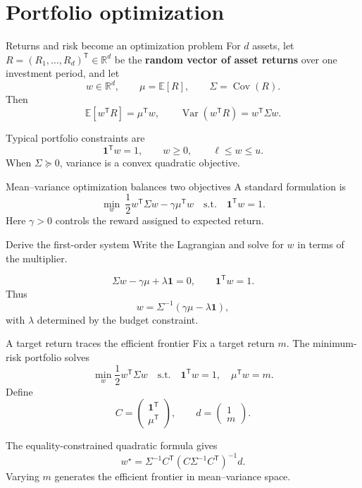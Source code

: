 \documentclass[aspectratio=169,11pt]{beamer}
\newcommand{\R}{\mathbb{R}}
\newcommand{\E}{\mathbb{E}}
\newcommand{\trans}{^{\mathsf T}}
\begin{document}
\section{Portfolio optimization}

\begin{frame}{Returns and risk become an optimization problem}
  For $d$ assets, let $R=(R_1,\ldots,R_d)\trans\in\R^d$ be the
  \textbf{random vector of asset returns} over one investment period, and let
  \[
    w\in\R^d,
    \qquad \mu=\E[R],
    \qquad \Sigma=\operatorname{Cov}(R).
  \]
  Then
  \[
    \E[w\trans R]=\mu\trans w,
    \qquad
    \operatorname{Var}(w\trans R)=w\trans\Sigma w.
  \]

  Typical portfolio constraints are
  \[
    \mathbf1\trans w=1,
    \qquad w\geq0,
    \qquad \ell\leq w\leq u.
  \]
  When $\Sigma\succeq0$, variance is a convex quadratic objective.
\end{frame}

\begin{frame}{Mean--variance optimization balances two objectives}
  A standard formulation is
  \[
    \boxed{
    \min_w\ \frac12w\trans\Sigma w-\gamma\mu\trans w
    \quad\text{s.t.}\quad \mathbf1\trans w=1.}
  \]
  Here $\gamma>0$ controls the reward assigned to expected return.

  \begin{exampleblock}{Derive the first-order system}
    Write the Lagrangian and solve for $w$ in terms of the multiplier.
  \end{exampleblock}

  \pause
  \[
    \Sigma w-\gamma\mu+\lambda\mathbf1=0,
    \qquad \mathbf1\trans w=1.
  \]
  Thus
  \[
    w=\Sigma^{-1}(\gamma\mu-\lambda\mathbf1),
  \]
  with $\lambda$ determined by the budget constraint.
\end{frame}

\begin{frame}{A target return traces the efficient frontier}
  Fix a target return $m$. The minimum-risk portfolio solves
  \[
    \min_w\frac12w\trans\Sigma w
    \quad\text{s.t.}\quad
    \mathbf1\trans w=1,
    \quad \mu\trans w=m.
  \]
  Define
  \[
    C=\begin{pmatrix}\mathbf1\trans\\\mu\trans\end{pmatrix},
    \qquad d=\begin{pmatrix}1\\m\end{pmatrix}.
  \]

  \pause
  The equality-constrained quadratic formula gives
  \[
    \boxed{w^\star=\Sigma^{-1}C\trans
    (C\Sigma^{-1}C\trans)^{-1}d.}
  \]
  Varying $m$ generates the efficient frontier in mean--variance space.
\end{frame}
\end{document}
